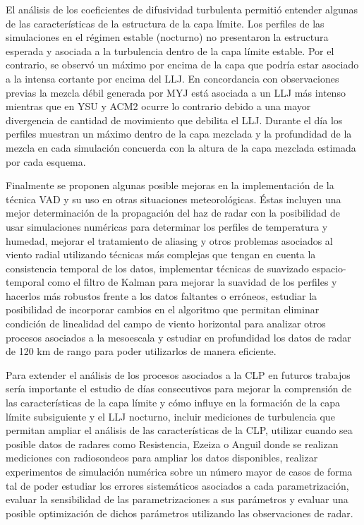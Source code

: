 \documentclass[12pt,spanish,oneside, a4paper]{book}
\begin{document}
El análisis de los coeficientes de difusividad turbulenta permitió
entender algunas de las características de la estructura de la capa
límite. Los perfiles de las simulaciones en el régimen estable
(nocturno) no presentaron la estructura esperada y asociada a la
turbulencia dentro de la capa límite estable. Por el contrario, se
observó un máximo por encima de la capa que podría estar asociado a la
intensa cortante por encima del LLJ. En concordancia con observaciones
previas la mezcla débil generada por MYJ está asociada a un LLJ más
intenso mientras que en YSU y ACM2 ocurre lo contrario debido a una
mayor divergencia de cantidad de movimiento que debilita el LLJ. Durante
el día los perfiles muestran un máximo dentro de la capa mezclada y la
profundidad de la mezcla en cada simulación concuerda con la altura de
la capa mezclada estimada por cada esquema.

Finalmente se proponen algunas posible mejoras en la implementación de
la técnica VAD y su uso en otras situaciones meteorológicas. Éstas
incluyen una mejor determinación de la propagación del haz de radar con
la posibilidad de usar simulaciones numéricas para determinar los
perfiles de temperatura y humedad, mejorar el tratamiento de aliasing y
otros problemas asociados al viento radial utilizando técnicas más
complejas que tengan en cuenta la consistencia temporal de los datos,
implementar técnicas de suavizado espacio-temporal como el filtro de
Kalman para mejorar la suavidad de los perfiles y hacerlos más robustos
frente a los datos faltantes o erróneos, estudiar la posibilidad de
incorporar cambios en el algoritmo que permitan eliminar condición de
linealidad del campo de viento horizontal para analizar otros procesos
asociados a la mesoescala y estudiar en profundidad los datos de radar
de 120 km de rango para poder utilizarlos de manera eficiente.

Para extender el análisis de los procesos asociados a la CLP en futuros
trabajos sería importante el estudio de días consecutivos para mejorar
la comprensión de las características de la capa límite y cómo influye
en la formación de la capa límite subsiguiente y el LLJ nocturno,
incluir mediciones de turbulencia que permitan ampliar el análisis de
las características de la CLP, utilizar cuando sea posible datos de
radares como Resistencia, Ezeiza o Anguil donde se realizan mediciones
con radiosondeos para ampliar los datos disponibles, realizar
experimentos de simulación numérica sobre un número mayor de casos de
forma tal de poder estudiar los errores sistemáticos asociados a cada
parametrización, evaluar la sensibilidad de las parametrizaciones a sus
parámetros y evaluar una posible optimización de dichos parámetros
utilizando las observaciones de radar.
\end{document}
